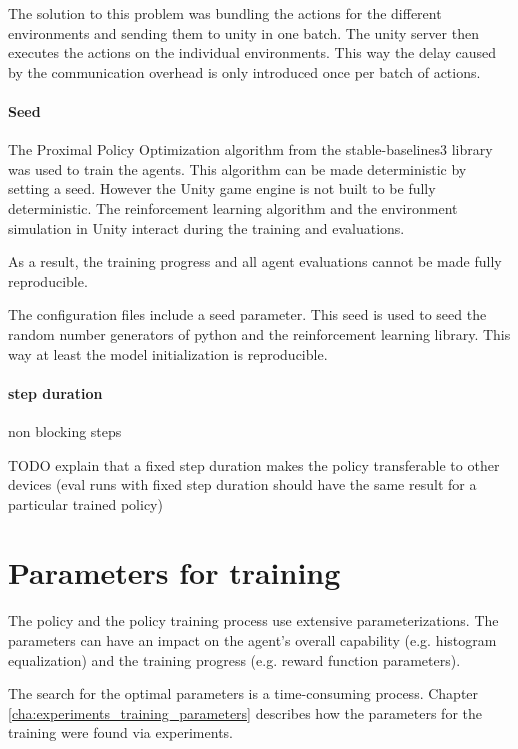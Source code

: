 The solution to this problem was bundling the actions for the different environments and sending them to unity in one batch. The unity server then executes the actions on the individual environments. This way the delay caused by the communication overhead is only introduced once per batch of actions.

\paragraph{Seed}

The Proximal Policy Optimization algorithm from the stable-baselines3 library was used to train the agents. This algorithm can be made deterministic by setting a seed. However the Unity game engine is not built to be fully deterministic. The reinforcement learning algorithm and the environment simulation in Unity interact during the training and evaluations. 

As a result, the training progress and all agent evaluations cannot be made fully reproducible.

The configuration files include a seed parameter. This seed is used to seed the random number generators of python and the reinforcement learning library. This way at least the model initialization is reproducible.


\paragraph{step duration}
non blocking steps

TODO explain that a fixed step duration makes the policy transferable to other devices (eval runs with fixed step duration should have the same result for a particular trained policy)

\section{Parameters for training}

The policy and the policy training process use extensive parameterizations. The parameters can have an impact on the agent's overall capability (e.g. histogram equalization) and the training progress (e.g. reward function parameters).

The search for the optimal parameters is a time-consuming process. Chapter \ref{cha:experiments_training_parameters} describes how the parameters for the training were found via experiments.

